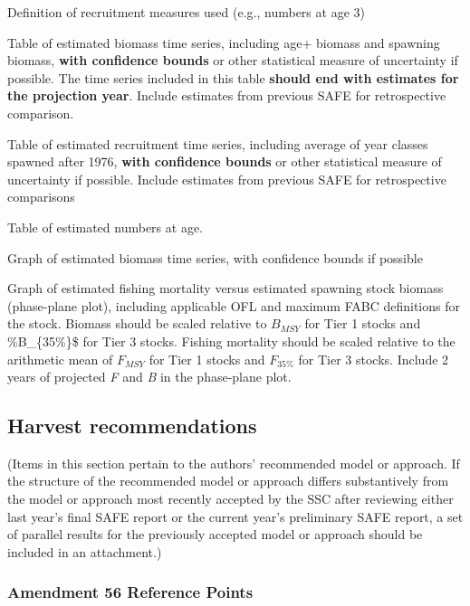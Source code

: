 \documentclass[
  11pt,
]{article}
\begin{document}
Definition of recruitment measures used (e.g., numbers at age 3)

Table of estimated biomass time series, including age+ biomass and spawning biomass, \textbf{with confidence bounds} or other statistical measure of uncertainty if possible.
The time series included in this table \textbf{should end with estimates for the projection year}. Include estimates from previous SAFE for retrospective comparison.

Table of estimated recruitment time series, including average of year classes spawned after 1976, \textbf{with confidence bounds} or other statistical measure of uncertainty if possible. Include estimates from previous SAFE for retrospective comparisons

Table of estimated numbers at age.

Graph of estimated biomass time series, with confidence bounds if possible

Graph of estimated fishing mortality versus estimated spawning stock biomass (phase-plane plot), including applicable OFL and maximum FABC definitions for the stock.
Biomass should be scaled relative to \(B_{MSY}\) for Tier 1 stocks and \%B\_\{35\%\}\$ for Tier 3 stocks.
Fishing mortality should be scaled relative to the arithmetic mean of \(F_{MSY}\) for Tier 1 stocks and \(F_{35\%}\) for Tier 3 stocks.
Include 2 years of projected \emph{F} and \emph{B} in the phase-plane plot.

\hypertarget{harvest-recommendations}{%
\subsection{Harvest recommendations}\label{harvest-recommendations}}

(Items in this section pertain to the authors' recommended model or approach.
If the structure of the recommended model or approach differs substantively from the model or approach most recently accepted by the SSC after reviewing either last year's final SAFE report or the current year's preliminary SAFE report, a set of parallel results for the previously accepted model or approach should be included in an attachment.)

\hypertarget{amendment-56-reference-points}{%
\subsubsection{Amendment 56 Reference Points}\label{amendment-56-reference-points}}
\end{document}
